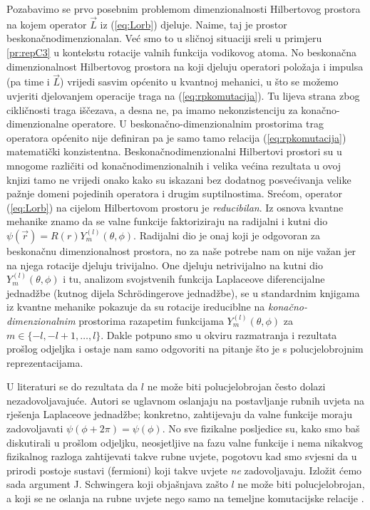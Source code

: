Pozabavimo se prvo posebnim problemom dimenzionalnosti Hilbertovog prostora
na kojem operator $\vec{L}$ iz (\ref{eq:Lorb}) djeluje. Naime, taj
je prostor beskonačnodimenzionalan. Već smo to u sličnoj situaciji
sreli u primjeru \ref{pr:repC3} u kontekstu rotacije valnih funkcija
vodikovog atoma. No beskonačna dimenzionalnost Hilbertovog prostora
na koji djeluju operatori položaja i impulsa (pa time i $\vec{L}$)
vrijedi sasvim općenito u kvantnoj mehanici, u što se možemo uvjeriti
djelovanjem operacije traga na (\ref{eq:rpkomutacija}). Tu lijeva
strana zbog cikličnosti traga iščezava, a desna ne, pa imamo nekonzistenciju
za konačno-dimenzionalne operatore. U beskonačno-dimenzionalnim prostorima
trag operatora općenito nije definiran pa je samo tamo relacija
(\ref{eq:rpkomutacija}) matematički konzistentna.
Beskonačnodimenzionalni Hilbertovi prostori su u mnogome različiti
od konačnodimenzionalnih i velika većina rezultata u ovoj knjizi tamo ne vrijedi
onako kako su iskazani bez dodatnog posvećivanja velike pažnje
domeni pojedinih operatora i drugim suptilnostima.
Srećom, operator (\ref{eq:Lorb}) na cijelom Hilbertovom prostoru
je \emph{reducibilan}. Iz osnova kvantne mehanike znamo da se valne
funkcije faktoriziraju na radijalni i kutni dio $\psi(\vec{r})
= R(r) Y^{(l)}_{m}(\theta, \phi)$. Radijalni dio je onaj koji
je odgovoran za beskonačnu dimenzionalnost prostora,
no za naše potrebe nam on nije važan jer na njega rotacije djeluju
trivijalno. One djeluju netrivijalno na kutni dio $Y^{(l)}_{m}(\theta, \phi)$
i tu, analizom svojstvenih funkcija Laplaceove diferencijalne
jednadžbe (kutnog dijela Schr\"{o}dingerove jednadžbe), se u
standardnim knjigama iz kvantne mehanike pokazuje da su rotacije
ireduciblne na \emph{konačno-dimenzionalnim} prostorima razapetim
funkcijama $Y^{(l)}_{m}(\theta, \phi)$ za $m \in \{-l, -l+1, \ldots, l\}$.
Dakle potpuno smo u okviru razmatranja i rezultata prošlog odjeljka i ostaje
nam samo odgovoriti na pitanje što je s polucjelobrojnim reprezentacijama.

U literaturi se do rezultata da $l$ ne može biti polucjelobrojan
često dolazi nezadovoljavajuće. Autori se uglavnom oslanjaju na postavljanje rubnih
uvjeta na rješenja Laplaceove jednadžbe; konkretno, zahtijevaju
da valne funkcije moraju zadovoljavati $\psi(\phi + 2\pi) = \psi(\phi)$.
No sve fizikalne posljedice su, kako smo baš diskutirali
u prošlom odjeljku, neosjetljive na fazu valne funkcije
i nema nikakvog fizikalnog razloga zahtijevati takve rubne uvjete,
pogotovu kad smo svjesni da u prirodi postoje sustavi (fermioni)
koji takve uvjete \emph{ne} zadovoljavaju. 
Izložit ćemo sada argument J. Schwingera koji objašnjava zašto $l$ ne može biti
polucjelobrojan, a koji se ne oslanja na rubne uvjete nego samo
na temeljne komutacijske relacije \cite{Ballentine:1998}.

